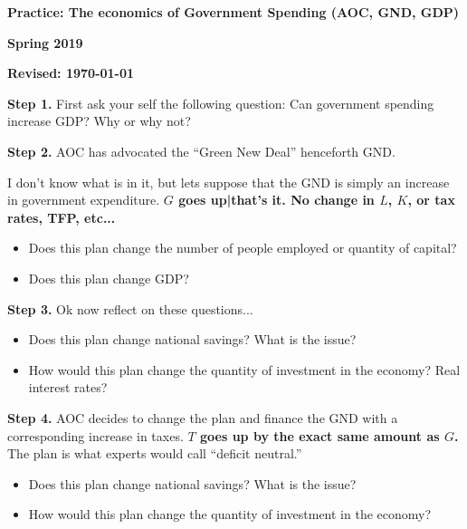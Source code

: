 \documentclass[12pt,pdftex,twoside,letterpaper]{exam}
\begin{document}
\centerline{\large\bf Practice: The economics of Government Spending (AOC, GND, GDP)}
\vspace{1mm}
\centerline{\large\bf Spring 2019}
\vspace{3mm}
\centerline{\bf Revised:  \today}
\bigskip
\bigskip

\textbf{Step 1.} First ask your self the following question: Can government spending increase GDP? Why or why not?\\
\bigskip



\textbf{Step 2.} AOC has advocated the ``Green New Deal'' henceforth GND.

I don't know what is in it, but lets suppose that the GND is simply an increase in government expenditure. \textbf{$G$ goes up|that's it. No change in $L$, $K$, or tax rates, TFP, etc...}
\begin{itemize}
\item Does this plan change the number of people employed or quantity of capital?

\item Does this plan change GDP?
\end{itemize}
\bigskip

\textbf{Step 3.} Ok now reflect on these questions...
\begin{itemize}
\item Does this plan change national savings? What is the issue?

\item How would this plan change the quantity of investment in the economy? Real interest rates?
\end{itemize}
\bigskip

\textbf{Step 4.} AOC decides to change the plan and finance the GND with a corresponding increase in taxes. \textbf{$T$ goes up by the exact same amount as $G$.} The plan is what experts would call ``deficit neutral.''
\begin{itemize}
\item Does this plan change national savings? What is the issue?

\item How would this plan change the quantity of investment in the economy?
\end{itemize}
\bigskip
\end{document}
